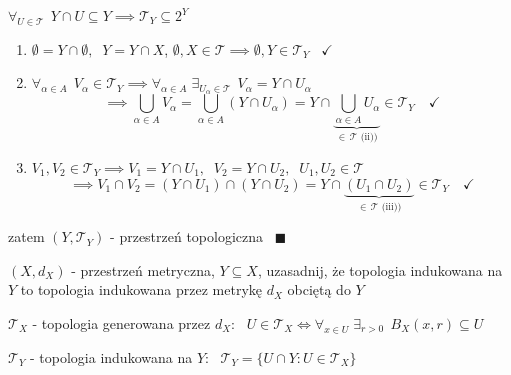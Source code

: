 \documentclass[a4paper,12pt]{article}
\begin{document}
\smallskip
\(\forall_{U \in \mathcal{T}} \;\, Y \cap U \subseteq Y \implies \mathcal{T}_Y \subseteq 2^Y\)
\begin{enumerate}[label=\roman*), leftmargin=1.9em, itemsep=0.2em, topsep=0.2em, parsep=0pt, partopsep=0pt]
    \item \(\emptyset = Y \cap \emptyset, \;\; Y = Y \cap X\), \; \(\emptyset, X \in \mathcal{T} \implies \emptyset, Y \in \mathcal{T}_Y\) \, \(\checkmark\)
    \item \(\forall_{\alpha \in A} \;\, V_\alpha \in \mathcal{T}_Y \implies \forall_{\alpha \in A} \; \exists_{U_\alpha \in \mathcal{T}} \;\, V_\alpha = Y \cap U_\alpha\)
    \[
    \implies \bigcup_{\alpha \in A} V_\alpha = \bigcup_{\alpha \in A} (Y \cap U_\alpha) = Y \cap \underbrace{\bigcup_{\alpha \in A} U_\alpha}_{\in \, \mathcal{T} \text{ (ii))}} \in \mathcal{T}_Y \quad \checkmark
    \]
    \item \(V_1, V_2 \in \mathcal{T}_Y \implies V_1 = Y \cap U_1, \;\; V_2 = Y \cap U_2, \;\; U_1, U_2 \in \mathcal{T}\)
    \[
    \implies V_1 \cap V_2 = (Y \cap U_1) \cap (Y \cap U_2) = Y \cap \underbrace{(U_1 \cap U_2)}_{\in \, \mathcal{T} \text{ (iii))}} \in \mathcal{T}_Y \quad \checkmark
    \]
\end{enumerate}
zatem \((Y, \mathcal{T}_Y)\) - przestrzeń topologiczna \, \(\blacksquare\)

\newpage
{}

\bigskip
{} \; \((X, d_X)\) - przestrzeń metryczna, \; \(Y \subseteq X\), \; uzasadnij, że topologia indukowana na \(Y\) to topologia indukowana przez metrykę \(d_X\) obciętą do \(Y\)

\smallskip
\(\mathcal{T}_X\) - topologia generowana przez \(d_X\): \, \(U \in \mathcal{T}_X \iff \forall_{x \in U} \; \exists_{r > 0} \;\, B_X(x, r) \subseteq U\)

\(\mathcal{T}_Y\) - topologia indukowana na \(Y\): \, \(\mathcal{T}_Y = \{U \cap Y : U \in \mathcal{T}_X\}\)
\end{document}
